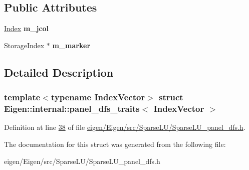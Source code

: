 \subsection*{Public Attributes}
\begin{DoxyCompactItemize}
\item 
\mbox{\label{struct_eigen_1_1internal_1_1panel__dfs__traits_ad35e09680a023ee42628342b1c166047}} 
\hyperlink{namespace_eigen_a62e77e0933482dafde8fe197d9a2cfde}{Index} {\bfseries m\+\_\+jcol}
\item 
\mbox{\label{struct_eigen_1_1internal_1_1panel__dfs__traits_af60d54a41a3f9986f178e2e8f32272e5}} 
Storage\+Index $\ast$ {\bfseries m\+\_\+marker}
\end{DoxyCompactItemize}


\subsection{Detailed Description}
\subsubsection*{template$<$typename Index\+Vector$>$\newline
struct Eigen\+::internal\+::panel\+\_\+dfs\+\_\+traits$<$ Index\+Vector $>$}



Definition at line \hyperlink{eigen_2_eigen_2src_2_sparse_l_u_2_sparse_l_u__panel__dfs_8h_source_l00038}{38} of file \hyperlink{eigen_2_eigen_2src_2_sparse_l_u_2_sparse_l_u__panel__dfs_8h_source}{eigen/\+Eigen/src/\+Sparse\+L\+U/\+Sparse\+L\+U\+\_\+panel\+\_\+dfs.\+h}.



The documentation for this struct was generated from the following file\+:\begin{DoxyCompactItemize}
\item 
eigen/\+Eigen/src/\+Sparse\+L\+U/\+Sparse\+L\+U\+\_\+panel\+\_\+dfs.\+h\end{DoxyCompactItemize}
